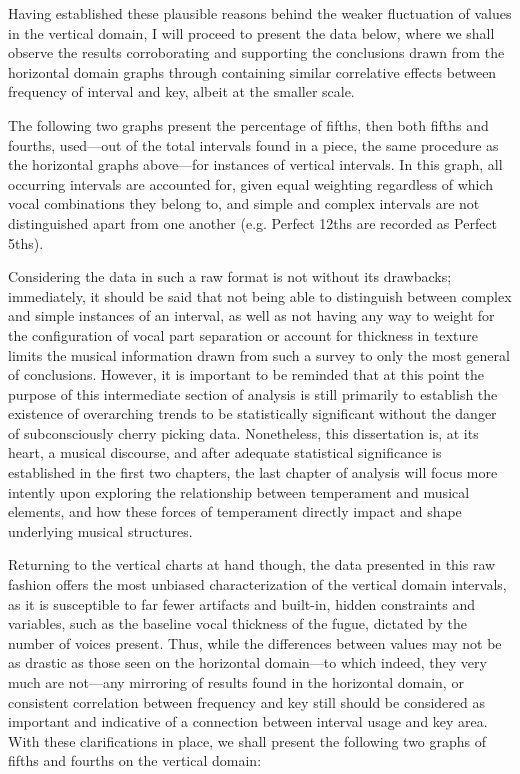 Having established these plausible reasons behind the weaker fluctuation
of values in the vertical domain, I will proceed to present the data
below, where we shall observe the results corroborating and supporting
the conclusions drawn from the horizontal domain graphs through
containing similar correlative effects between frequency of interval and
key, albeit at the smaller scale.

    The following two graphs present the percentage of fifths, then both
fifths and fourths, used---out of the total intervals found in a
piece, the same procedure as the horizontal graphs above---for
instances of vertical intervals. In this graph, all occurring intervals
are accounted for, given equal weighting regardless of which vocal
combinations they belong to, and simple and complex intervals are not
distinguished apart from one another (e.g. Perfect 12ths are recorded as
Perfect 5ths).

Considering the data in such a raw format is not without its drawbacks;
immediately, it should be said that not being able to distinguish
between complex and simple instances of an interval, as well as not
having any way to weight for the configuration of vocal part separation
or account for thickness in texture limits the musical information drawn
from such a survey to only the most general of conclusions. However, it
is important to be reminded that at this point the purpose of this
intermediate section of analysis is still primarily to establish the
existence of overarching trends to be statistically significant without
the danger of subconsciously cherry picking data. Nonetheless, this
dissertation is, at its heart, a musical discourse, and after adequate
statistical significance is established in the first two chapters, the
last chapter of analysis will focus more intently upon exploring the
relationship between temperament and musical elements, and how these
forces of temperament directly impact and shape underlying musical
structures.

Returning to the vertical charts at hand though, the data presented in
this raw fashion offers the most unbiased characterization of the
vertical domain intervals, as it is susceptible to far fewer artifacts
and built-in, hidden constraints and variables, such as the baseline
vocal thickness of the fugue, dictated by the number of voices present.
Thus, while the differences between values may not be as drastic as
those seen on the horizontal domain---to which indeed, they very
much are not---any mirroring of results found in the horizontal
domain, or consistent correlation between frequency and key still should
be considered as important and indicative of a connection between
interval usage and key area. With these clarifications in place, we
shall present the following two graphs of fifths and fourths on the
vertical domain:



